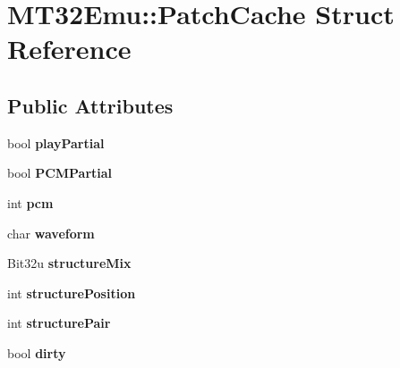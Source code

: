 \hypertarget{structMT32Emu_1_1PatchCache}{\section{M\-T32\-Emu\-:\-:Patch\-Cache Struct Reference}
\label{structMT32Emu_1_1PatchCache}
}
\subsection*{Public Attributes}
\begin{DoxyCompactItemize}
\item 
\hypertarget{structMT32Emu_1_1PatchCache_af750a9b44e9a2d3139004fdaf833f98d}{bool {\bfseries play\-Partial}}\label{structMT32Emu_1_1PatchCache_af750a9b44e9a2d3139004fdaf833f98d}

\item 
\hypertarget{structMT32Emu_1_1PatchCache_a7d13ebd3b4682dc804bb87e34cc2507e}{bool {\bfseries P\-C\-M\-Partial}}\label{structMT32Emu_1_1PatchCache_a7d13ebd3b4682dc804bb87e34cc2507e}

\item 
\hypertarget{structMT32Emu_1_1PatchCache_ab1f508ae1e7afa6920e6eaa227a0bec1}{int {\bfseries pcm}}\label{structMT32Emu_1_1PatchCache_ab1f508ae1e7afa6920e6eaa227a0bec1}

\item 
\hypertarget{structMT32Emu_1_1PatchCache_a4a628f8fe49ea5e995b962fb49347293}{char {\bfseries waveform}}\label{structMT32Emu_1_1PatchCache_a4a628f8fe49ea5e995b962fb49347293}

\item 
\hypertarget{structMT32Emu_1_1PatchCache_a6e55bd1ef71356a23ffc358c35b87f75}{Bit32u {\bfseries structure\-Mix}}\label{structMT32Emu_1_1PatchCache_a6e55bd1ef71356a23ffc358c35b87f75}

\item 
\hypertarget{structMT32Emu_1_1PatchCache_a2580df2c55d215335541acef5cd5fd86}{int {\bfseries structure\-Position}}\label{structMT32Emu_1_1PatchCache_a2580df2c55d215335541acef5cd5fd86}

\item 
\hypertarget{structMT32Emu_1_1PatchCache_a5f66c5a4385612bf86682721f91f7a37}{int {\bfseries structure\-Pair}}\label{structMT32Emu_1_1PatchCache_a5f66c5a4385612bf86682721f91f7a37}

\item 
\hypertarget{structMT32Emu_1_1PatchCache_a2d20ddced98132e8d3689832a2b2501f}{bool {\bfseries dirty}}\label{structMT32Emu_1_1PatchCache_a2d20ddced98132e8d3689832a2b2501f}


\end{DoxyCompactItemize}

